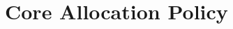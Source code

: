 \documentclass[12pt,a4paper]{book}
\begin{document}
\section{Core Allocation Policy}\label{ch:di:pol}
%   
%

%

\end{document}
